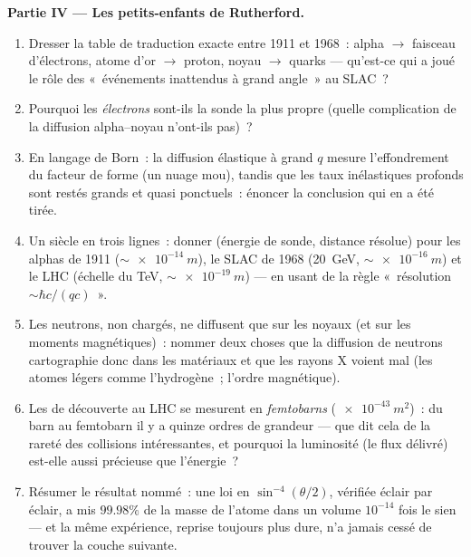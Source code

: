 \begin{problem}
\medskip\noindent\textbf{Partie IV --- Les petits-enfants de Rutherford.}
\begin{enumerate}[resume]
  \item Dresser la table de traduction exacte entre 1911 et 1968~:
        alpha $\to$ faisceau d'électrons, atome d'or $\to$ proton,
        noyau $\to$ quarks --- qu'est-ce qui a joué le rôle des
        «~événements inattendus à grand angle~» au SLAC~?
  \item Pourquoi les \emph{électrons} sont-ils la sonde la plus propre
        (quelle complication de la diffusion alpha--noyau n'ont-ils
        pas)~?
  \item En langage de Born~: la diffusion élastique à grand $q$ mesure
        l'effondrement du facteur de forme (un nuage mou), tandis que
        les taux inélastiques profonds sont restés grands et
        quasi ponctuels~: énoncer la conclusion qui en a été tirée.
  \item Un siècle en trois lignes~: donner (énergie de sonde,
        distance résolue) pour les alphas de 1911
        ($\sim\qty{e-14}{m}$), le SLAC de 1968 (\qty{20}{GeV},
        $\sim\qty{e-16}{m}$) et le LHC (échelle du TeV,
        $\sim\qty{e-19}{m}$) --- en usant de la règle «~résolution
        $\sim \hbar c/(qc)$~».
  \item Les neutrons, non chargés, ne diffusent que sur les noyaux (et
        sur les moments magnétiques)~: nommer deux choses que la
        diffusion de neutrons cartographie donc dans les matériaux et
        que les rayons X voient mal (les atomes légers comme
        l'hydrogène~; l'ordre magnétique).
  \item Les  de découverte au LHC se mesurent en
        \emph{femtobarns} ($\qty{e-43}{m^2}$)~: du barn au femtobarn
        il y a quinze ordres de grandeur --- que dit cela de la rareté
        des collisions intéressantes, et pourquoi la luminosité (le
        flux délivré) est-elle aussi précieuse que l'énergie~?
  \item Résumer le résultat nommé~: une loi en $\sin^{-4}(\theta/2)$,
        vérifiée éclair par éclair, a mis $99.98\%$ de la masse de
        l'atome dans un volume $10^{-14}$ fois le sien --- et la même
        expérience, reprise toujours plus dure, n'a jamais cessé de
        trouver la couche suivante.
\end{enumerate}
\end{problem}

